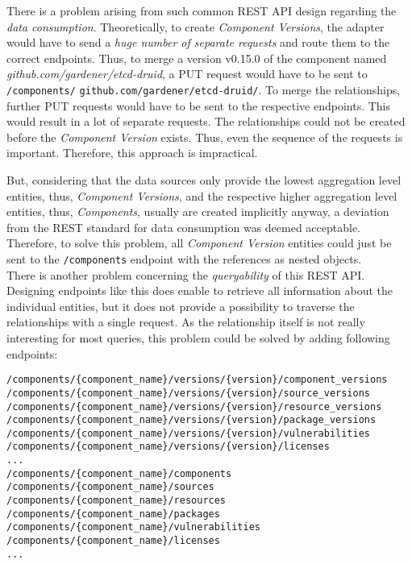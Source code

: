 There is a problem arising from such common REST API design regarding the \emph{data consumption}. Theoretically, to create \emph{Component Versions}, the adapter would have to send a \emph{huge number of separate requests} and route them to the correct endpoints. Thus, to merge a version v0.15.0 of the component named \emph{github.com/gardener/etcd-druid}, a PUT request would have to be sent to \lstinline|/components/| \lstinline|github.com/gardener/etcd-druid/|. To merge the relationships, further PUT requests would have to be sent to the respective endpoints. This would result in a lot of separate requests. The relationships could not be created before the \emph{Component Version} exists. Thus, even the sequence of the requests is important. Therefore, this approach is impractical.\par
But, considering that the data sources only provide the lowest aggregation level entities, thus, \emph{Component Versions}, and the respective higher aggregation level entities, thus, \emph{Components}, usually are created implicitly anyway, a deviation from the REST standard for data consumption was deemed acceptable. Therefore, to solve this problem, all \emph{Component Version} entities could just be sent to the \lstinline|/components| endpoint with the references as nested objects.\\

There is another problem concerning the \emph{queryability} of this REST API. Designing endpoints like this does enable to retrieve all information about the individual entities, but it does not provide a possibility to traverse the relationships with a single request. As the relationship itself is not really interesting for most queries, this problem could be solved by adding following endpoints:

\begin{lstlisting}[basicstyle=\tiny, caption=REST API Query Endpoints, captionpos=b, label=lst:RESTAPIQueryEndpoints]
/components/{component_name}/versions/{version}/component_versions
/components/{component_name}/versions/{version}/source_versions
/components/{component_name}/versions/{version}/resource_versions
/components/{component_name}/versions/{version}/package_versions
/components/{component_name}/versions/{version}/vulnerabilities
/components/{component_name}/versions/{version}/licenses
...
/components/{component_name}/components
/components/{component_name}/sources
/components/{component_name}/resources
/components/{component_name}/packages
/components/{component_name}/vulnerabilities
/components/{component_name}/licenses
...
\end{lstlisting}

